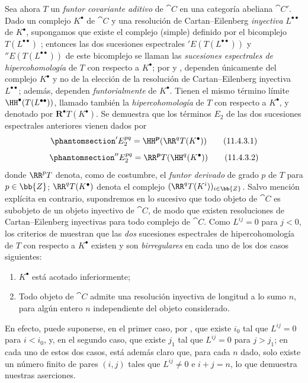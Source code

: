\documentclass[oneside]{amsart}
\newcommand{\oldpage}[2][]{{\marginnote{\normalfont\textbf{#1}~|~#2}}\ignorespaces}
\let\EGAOriginalLabel\label
\renewcommand{\label}[1]{\phantomsection\EGAOriginalLabel{#1}}
\begin{document}
\begin{env}[11.4.3]
\label{0.11.4.3}
Sea ahora $T$ un \emph{funtor covariante aditivo} de $\cat{C}$ en una categoría abeliana $\cat{C'}$.
Dado un complejo $K^\bullet$ de $\cat{C}$ y una resolución de Cartan--Eilenberg \emph{inyectiva} $L^{\bullet\bullet}$ de $K^{\bullet}$, supongamos que existe el complejo (simple) definido por el bicomplejo $T(L^{\bullet\bullet})$ ;
entonces las dos sucesiones espectrales $'E(T(L^{\bullet\bullet}))$ y $''E(T(L^{\bullet\bullet}))$ de este bicomplejo se llaman las \emph{sucesiones espectrales de hipercohomología} de $T$ con respecto a $K^\bullet$;
por  y , dependen únicamente del complejo $K^\bullet$ y no de la elección de la resolución de Cartan--Eilenberg inyectiva $L^{\bullet\bullet}$;
además, dependen \emph{funtorialmente} de $K^\bullet$.
Tienen el mismo término límite $\HH^\bullet(T(L^{\bullet\bullet}))$, llamado también la \emph{hipercohomología} de $T$ con respecto a $K^\bullet$, y denotado por $\mathbf{R}^\bullet T(K^\bullet)$.
Se demuestra que los términos $E_2$ de las dos sucesiones espectrales anteriores vienen dados por
\[
\label{0.11.4.3.1}
  'E_2^{pq}
  = \HH^{\boldsymbol{p}}(\RR^q T(K^\bullet))
\tag{11.4.3.1}
\]
\[
\label{0.11.4.3.2}
  ''E_2^{pq}
  = \RR^{\boldsymbol{p}} T(\HH^q(K^\bullet))
\tag{11.4.3.2}
\]
\oldpage[0\textsubscript{III}]{34}
donde $\RR^p T$ denota, como de costumbre, el \emph{funtor derivado} de grado $p$ de $T$ para $p\in\bb{Z}$;
$\RR^q T(K^\bullet)$ denota el complejo $(\RR^q T(K^i))_{i\in\bb{Z}}$.
\label{0.11.4.4}
Salvo mención explícita en contrario, supondremos en lo sucesivo que todo objeto de $\cat{C}$ es subobjeto de un objeto inyectivo de $\cat{C}$, de modo que existen resoluciones de Cartan--Eilenberg inyectivas para todo complejo de $\cat{C}$.
Como $L^{ij}=0$ para $j<0$, los criterios de  muestran que las \emph{dos} sucesiones espectrales de hipercohomología de $T$ con respecto a $K^\bullet$ existen y son \emph{birregulares} en cada uno de los dos casos siguientes:
\begin{enumerate}
  \item $K^\bullet$ está acotado inferiormente;
  \item Todo objeto de $\cat{C}$ admite una resolución inyectiva de longitud a lo sumo $n$, para algún entero $n$ independiente del objeto considerado.
\end{enumerate}
En efecto, puede suponerse, en el primer caso, por , que existe $i_0$ tal que $L^{ij}=0$ para $i<i_0$, y, en el segundo caso, que existe $j_1$ tal que $L^{ij}=0$ para $j>j_1$;
en cada uno de estos dos casos, está además claro que, para cada $n$ dado, solo existe un número finito de pares $(i,j)$ tales que $L^{ij}\neq 0$ e $i+j=n$, lo que demuestra nuestras aserciones.


\end{env}
\end{document}
